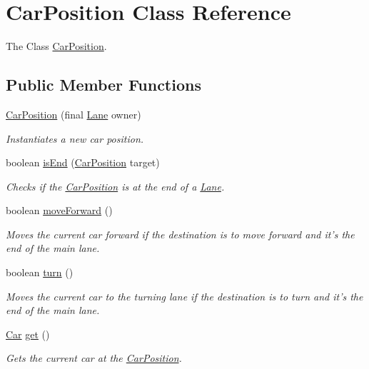 \hypertarget{class_car_position}{\section{Car\+Position Class Reference}
\label{class_car_position}
}


The Class \hyperlink{class_car_position}{Car\+Position}.  


\subsection*{Public Member Functions}
\begin{DoxyCompactItemize}
\item 
\hyperlink{class_car_position_a05ba9c48ae0dc6bcc7bef617e370ae77}{Car\+Position} (final \hyperlink{class_lane}{Lane} owner)
\begin{DoxyCompactList}\small\item\em Instantiates a new car position. \end{DoxyCompactList}\item 
boolean \hyperlink{class_car_position_ac7b16dd1c871461b96e3a90ab96c9323}{is\+End} (\hyperlink{class_car_position}{Car\+Position} target)
\begin{DoxyCompactList}\small\item\em Checks if the \hyperlink{class_car_position}{Car\+Position} is at the end of a \hyperlink{class_lane}{Lane}. \end{DoxyCompactList}\item 
boolean \hyperlink{class_car_position_a060a8a0043d119878c1a35af6b42291a}{move\+Forward} ()
\begin{DoxyCompactList}\small\item\em Moves the current car forward if the destination is to move forward and it's the end of the main lane. \end{DoxyCompactList}\item 
boolean \hyperlink{class_car_position_a3a07aa3135efaf79cc05273de3d0eed9}{turn} ()
\begin{DoxyCompactList}\small\item\em Moves the current car to the turning lane if the destination is to turn and it's the end of the main lane. \end{DoxyCompactList}\item 
\hyperlink{class_car}{Car} \hyperlink{class_car_position_a7f67bb341d15a5d2dfdfb4958e09e96a}{get} ()
\begin{DoxyCompactList}\small\item\em Gets the current car at the \hyperlink{class_car_position}{Car\+Position}. \end{DoxyCompactList}\item 

\end{DoxyCompactItemize}
